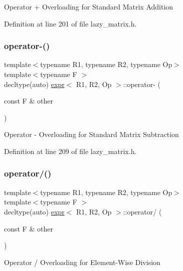 Operator + Overloading for Standard Matrix Addition 

Definition at line 201 of file lazy\+\_\+matrix.\+h.

\mbox{\label{classexpr_ab46b7e78ad487b606b12e81c24cb3eeb}} 
\subsubsection{\texorpdfstring{operator-\/()}{operator-()}}
{\footnotesize\ttfamily template$<$typename R1, typename R2, typename Op$>$ \\
template$<$typename F $>$ \\
decltype(auto) \mbox{\hyperlink{classexpr}{expr}}$<$ R1, R2, Op $>$\+::operator-\/ (\begin{DoxyParamCaption}\item[{const F \&}]{other }\end{DoxyParamCaption})\hspace{0.3cm}{\ttfamily [inline]}}

Operator -\/ Overloading for Standard Matrix Subtraction 

Definition at line 209 of file lazy\+\_\+matrix.\+h.

\mbox{\label{classexpr_abf2a263cd1346fe818d886cdc94ae4d0}} 
\subsubsection{\texorpdfstring{operator/()}{operator/()}}
{\footnotesize\ttfamily template$<$typename R1, typename R2, typename Op$>$ \\
template$<$typename F $>$ \\
decltype(auto) \mbox{\hyperlink{classexpr}{expr}}$<$ R1, R2, Op $>$\+::operator/ (\begin{DoxyParamCaption}\item[{const F \&}]{other }\end{DoxyParamCaption})\hspace{0.3cm}{\ttfamily [inline]}}

Operator / Overloading for Element-\/\+Wise Division 

